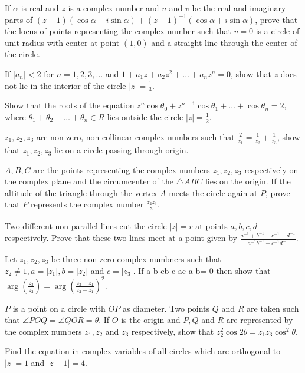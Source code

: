 \item If $\alpha$ is real and $z$ is a complex number and $u$ and $v$ be the real and imaginary parts of $(z - 1)(\cos\alpha -
  i\sin\alpha) + (z - 1)^{-1}(\cos\alpha + i\sin\alpha)$, prove that the locus of points representing the complex number such that
  $v =0$ is a circle of unit radius with center at point $(1, 0)$ and a straight line through the center of the circle.
\item If $|a_n| < 2$ for $n = 1, 2, 3, \ldots$ and $1 + a_1z + a_2z^2 + \ldots + a_nz^n = 0$, show that $z$ does not lie in the
  interior of the circle $|z| = \frac{1}{3}$.
\item Show that the roots of the equation $z^n\cos\theta_0 + z^{n - 1}\cos\theta_1 + \ldots + \cos\theta_n = 2$, where $\theta_1 +
  \theta_2 + \ldots + \theta_n\in R$ lies outside the circle $|z| = \frac{1}{2}$.
\item $z_1, z_2, z_3$ are non-zero, non-collinear complex numbers such that $\frac{2}{z_1} = \frac{1}{z_2} + \frac{1}{z_3}$, show
  that $z_1, z_2, z_3$ lie on a circle passing through origin.
\item $A, B, C$ are the points representing the complex numbers $z_1,z_2,z_3$ respectively on the complex plane and the
  circumcenter of the $\triangle ABC$ lies on the origin. If the altitude of the triangle through the vertex $A$ meets the circle
  again at $P$, prove that $P$ represents the complex number $\frac{z_2z_3}{z_1}$.
\item Two different non-parallel lines cut the circle $|z| = r$ at points $a, b, c, d$ respectively. Prove that these two lines
  meet at a point given by $\frac{a^{-1} + b^{-1} - c^{-1} - d^{-1}}{a^{-1}b^{-1}- c^{-1}d^{-1}}$.
\item Let $z_1, z_2, z_3$ be three non-zero complex numbners such that $z_2\neq 1, a = |z_1|, b = |z_2|$ and $c =
  |z_3|$. If \startdeterminant \NC a \NC b \NC c\NR\NC b \NC c \NC a\NR\NC c \NC a \NC b\NR\stopdeterminant = 0
    then show that $\arg\left(\frac{z_3}{z_2}\right) = \arg\left(\frac{z_3 - z_1}{z_2 - z_1}\right)^2$.
\item $P$ is a point on a circle with $OP$ as diameter. Two points $Q$ and $R$ are taken such that $\angle POQ = \angle QOR =
  \theta$. If $O$ is the origin and $P, Q$ and $R$ are represented by the complex numbers $z_1, z_2$ and $z_3$ respectively, show
  that $z_2^2\cos2\theta = z_1z_3\cos^2\theta$.
\item Find the equation in complex variables of all circles which are orthogonal to $|z| = 1$ and $|z - 1| = 4$.

